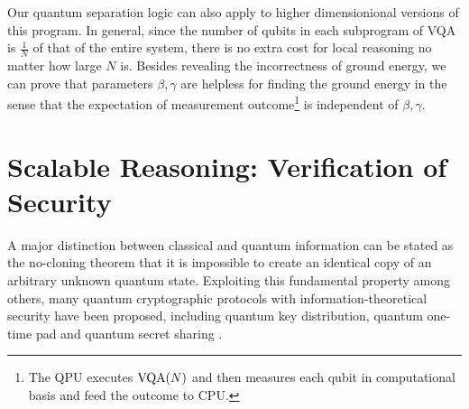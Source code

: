 \documentclass[conference,compsoc, 10pt]{IEEEtran}
\newcommand{\jh}[1]{\textit{\color{red}[JH] : #1}}
\newcommand{\lz}[1]{\textit{\color{blue}[LZ] : #1}}
\begin{document}
  Our quantum separation logic can also apply to higher dimensionional versions
  of this program. In general, since the number of qubits in each subprogram of
  VQA is $\frac{1}{N}$ of that of the entire system, there is no extra cost for
  local reasoning no matter how large $N$ is. 
	Besides revealing the incorrectness of ground energy, we can prove that parameters $\beta,\gamma$ are helpless for finding the ground energy %
	in the sense that the expectation of measurement outcome\footnote{The QPU executes ${\rm VQA}(N)$ and then measures each qubit in computational basis and feed the outcome to CPU.} is independent of $\beta,\gamma$.
	
	\section{Scalable Reasoning: Verification of Security}\label{sec-security-exam}
	
	A major distinction between classical and quantum information can be stated as the no-cloning theorem that it is impossible to create an identical copy of an arbitrary unknown quantum state. Exploiting this fundamental property among others, many quantum cryptographic protocols with information-theoretical security have been proposed, including quantum key distribution, quantum one-time pad \cite{MTW00,BR03} and quantum secret sharing \cite{HBB99, CGL99}.
	
\end{document}
